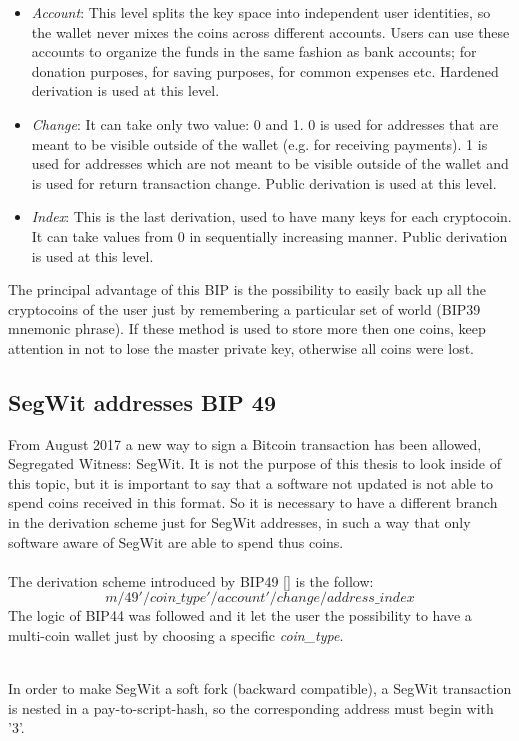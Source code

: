 \begin{itemize}
	\item \textit{Account}: This level splits the key space into independent user identities, so the wallet never mixes the coins across different accounts.
	Users can use these accounts to organize the funds in the same fashion as bank accounts; for donation purposes, for saving purposes, for common expenses etc.
	Hardened derivation is used at this level.
	\item \textit{Change}: It can take only two value: 0 and 1. 0 is used for addresses that are meant to be visible outside of the wallet (e.g. for receiving payments). 1 is used for addresses which are not meant to be visible outside of the wallet and is used for return transaction change.
	Public derivation is used at this level.
	\item \textit{Index}: This is the last derivation, used to have many keys for each cryptocoin. It can take values from 0 in sequentially increasing manner. Public derivation is used at this level.
\end{itemize}
The principal advantage of this BIP is the possibility to easily back up all the cryptocoins of the user just by remembering a particular set of world (BIP39 mnemonic phrase). If these method is used to store more then one coins, keep attention in not to lose the master private key, otherwise all coins were lost.

\subsection{SegWit addresses BIP 49}
From August 2017 a new way to sign a Bitcoin transaction has been allowed, Segregated Witness: SegWit. It is not the purpose of this thesis to look inside of this topic, but it is important to say that a software not updated is not able to spend coins received in this format. So it is necessary to have a different branch in the derivation scheme just for SegWit addresses, in such a way that only software aware of SegWit are able to spend thus coins.
\\ \\
The derivation scheme introduced by BIP49 [\cite{6}] is the follow:
\begin{equation*}
m / 49' / coin\_type' / account' / change / address\_index
\end{equation*}
The logic of BIP44 was followed and it let the user the possibility to have a multi-coin wallet just by choosing a specific \textit{coin\_type}.
\\ \\
\begin{remark}
	In order to make SegWit a soft fork (backward compatible), a SegWit transaction is nested in a pay-to-script-hash, so the corresponding address must begin with '3'.	
\end{remark}




